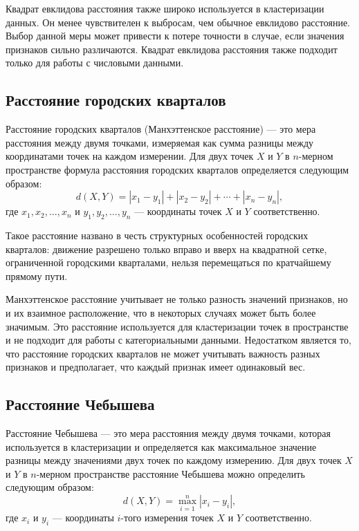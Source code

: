 Квадрат евклидова расстояния также широко используется в кластеризации данных. Он менее чувствителен к выбросам, чем обычное евклидово расстояние. Выбор данной меры может привести к потере точности в случае, если значения признаков сильно различаются. Квадрат евклидова расстояния также подходит только для работы с числовыми данными.

\subsection{Расстояние городских кварталов}

Расстояние городских кварталов (Манхэттенское расстояние) \cite{ManhattanDistance} --- это мера расстояния между двумя точками, измеряемая как сумма разницы между координатами точек на каждом измерении. Для двух точек $X$ и $Y$ в $n$-мерном пространстве формула расстояния городских кварталов определяется следующим образом:
\begin{equation}
    d(X,Y) = |x_1-y_1| + |x_2-y_2| + \cdots + |x_n-y_n|,
\end{equation}
где $x_1,x_2,\ldots,x_n$ и $y_1,y_2,\ldots,y_n$ --- координаты точек $X$ и $Y$ соответственно. 

Такое расстояние названо в честь структурных особенностей городских кварталов: движение разрешено только вправо и вверх на квадратной сетке, ограниченной городскими кварталами, нельзя перемещаться по кратчайшему прямому пути.

Манхэттенское расстояние учитывает не только разность значений признаков, но и их взаимное расположение, что в некоторых случаях может быть более значимым. Это расстояние используется для кластеризации точек в пространстве и не подходит для работы с категориальными данными. Недостатком является то, что расстояние городских кварталов не может учитывать важность разных признаков и предполагает, что каждый признак имеет одинаковый вес.

\subsection{Расстояние Чебышева}

Расстояние Чебышева \cite{9DistanceMeasures} --- это мера расстояния между двумя точками, которая используется в кластеризации и определяется как максимальное значение разницы между значениями двух точек по каждому измерению. Для двух точек $X$ и $Y$ в $n$-мерном пространстве расстояние Чебышева можно определить следующим образом:
\begin{equation}
    d(X,Y) = \max_{i=1}^n |x_i-y_i|,
\end{equation}
где $x_i$ и $y_i$ --- координаты $i$-того измерения точек $X$ и $Y$ соответственно. 

